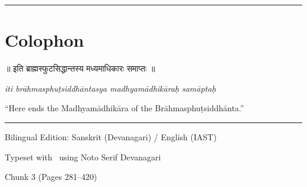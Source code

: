 \documentclass[11pt,a4paper]{article}
\newcommand{\longline}{\noindent\rule{\textwidth}{0.4pt}}
\newcommand{\dev}[1]{{\devanagarifont #1}}
\theoremstyle{definition}
\begin{document}
\longline

\newpage
\section*{Colophon}

\begin{center}
\begin{minipage}{0.85\textwidth}
\centering
{\large\dev{॥ इति ब्राह्मस्फुटसिद्धान्तस्य मध्यमाधिकारः समाप्तः ॥}}

\vspace{0.5cm}
\textit{iti br\=ahmasphu\d{t}siddh\=antasya madhyam\=adhik\=ara\d{h} sam\=apta\d{h}}

\vspace{0.5cm}
``Here ends the Madhyam\=adhik\=ara of the Br\=ahmasphu\d{t}siddh\=anta.''

\vspace{1.5cm}
\rule{0.6\textwidth}{0.4pt}

\vspace{0.5cm}
{\small Bilingual Edition: Sanskrit (Devanagari) / English (IAST)}

\vspace{0.3cm}
{\small Typeset with \XeLaTeX\ using Noto Serif Devanagari}

\vspace{0.3cm}
{\small Chunk 3 (Pages 281--420)}
\end{minipage}
\end{center}
\end{document}
